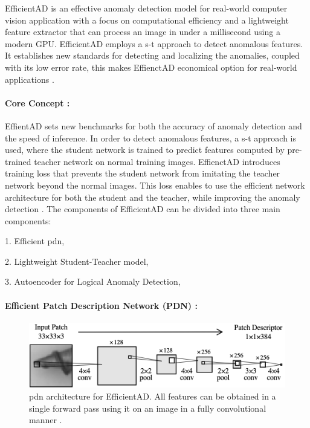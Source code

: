 EfficientAD is an effective anomaly detection model for real-world computer vision application with a focus on computational efficiency and a lightweight feature extractor that can process an image in under a millisecond using a modern GPU. EfficientAD employs a \gls{s-t} approach to detect anomalous features. It establishes new standards for detecting and localizing the anomalies, coupled with its low error rate, this makes EffienctAD economical option for real-world applications \cite{batzner2024efficientadaccuratevisualanomaly}.

\paragraph*{Core Concept :}

EffientAD sets new benchmarks for both the accuracy of anomaly detection and the speed of inference. In order to detect anomalous features, a \gls{s-t} approach is used, where the student network is trained to predict features computed by pre-trained teacher network on normal training images. EffienctAD introduces training loss that prevents the student network from imitating the teacher network beyond the normal images. This loss enables to use the efficient network architecture for both the student and the teacher, while improving the anomaly detection \cite{batzner2024efficientadaccuratevisualanomaly}. The components of EfficientAD can be divided into three main components:

1. Efficient \gls{pdn},

2. Lightweight Student-Teacher model,

3. Autoencoder for Logical Anomaly Detection,

\paragraph*{Efficient Patch Description Network (PDN) :}

\begin{figure}[ht!]
    \centering
    \includegraphics[width=1.1\linewidth]{Rohit_Master_Thesis//Images/pdn.png}
    \caption{\gls{pdn} architecture for EfficientAD. All features can be obtained in a single forward pass using it on an image in a fully convolutional manner \cite{batzner2024efficientadaccuratevisualanomaly}.}
    \label{fig:pdn architecture}
\end{figure}

